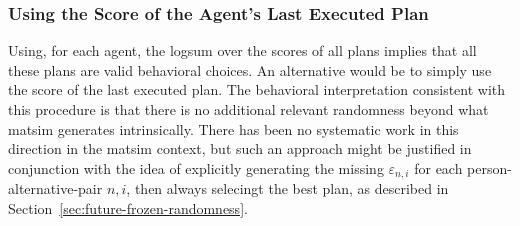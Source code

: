 %
%



\subsubsection{Using the Score of the Agent's Last Executed Plan}
\label{ch:economicEval:valuingBehavior:output2Eval:executed}
Using, for each agent, the logsum over the scores of all plans implies that all these plans are valid behavioral choices.  An alternative would be to simply use the score of the last executed plan.  The behavioral interpretation consistent with this procedure is that there is no additional relevant randomness beyond what \acrshort{matsim} generates intrinsically.  There has  been no systematic work in this direction in the \acrshort{matsim} context, but such an approach might be justified 
in conjunction 
with the idea of explicitly generating the missing $\varepsilon_{n,i}$ for each person-alternative-pair $n,i$,  then always selecingt the best plan, as described in Section~\ref{sec:future-frozen-randomness}.



